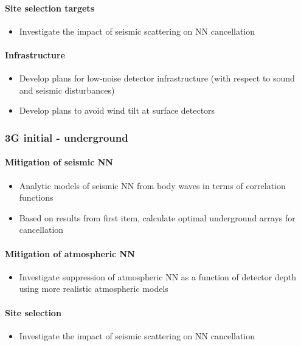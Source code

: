 \paragraph{Site selection targets}
\begin{itemize}
\item Investigate the impact of seismic scattering on NN cancellation
\end{itemize}

\paragraph{Infrastructure}
\begin{itemize}
\item Develop plans for low-noise detector infrastructure (with respect to sound and seismic disturbances)
\item Develop plans to avoid wind tilt at surface detectors
\end{itemize}

\subsubsection{3G initial - underground}
\paragraph{Mitigation of seismic NN}
\begin{itemize}
\item Analytic models of seismic NN from body waves in terms of correlation functions
\item Based on results from first item, calculate optimal underground arrays for cancellation
\end{itemize}

\paragraph{Mitigation of atmospheric NN}
\begin{itemize}
\item Investigate suppression of atmospheric NN as a function of detector depth using more realistic atmospheric models
\end{itemize}

\paragraph{Site selection}
\begin{itemize}
\item Investigate the impact of seismic scattering on NN cancellation
\end{itemize}

